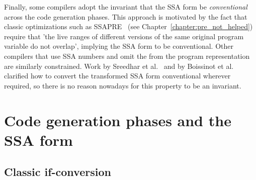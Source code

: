 Finally, some compilers adopt the invariant that the SSA form be
\emph{conventional} across the code generation phases. This approach is
motivated by the fact that classic optimizations such as SSAPRE~\cite{Kennedy:1999:TOPLAS} (see Chapter~\ref{chapter:pre_not_helped}) require that 'the live ranges of different versions
of the same original program variable do not overlap', implying the SSA form to be
conventional. Other compilers that use SSA numbers and omit the \phifuns
from the program representation~\cite{Lapkowski:1996:CASCON} are similarly
constrained. Work by Sreedhar et al.~\cite{Sreedhar:1999:SAS} and by Boissinot
et al.~\cite{boissinot09revisiting} clarified how to convert the transformed SSA
form conventional wherever required, so there is no reason nowadays for this
property to be an invariant.



\section{Code generation phases and the SSA form}
\label{sec:ssa-codegen-suitability}

\begin{comment}

\subsection{Instruction selection}

Instruction selection (Chapter~\ref{chapter:code_selection}). Unlike
classic techniques that match one IR tree or one DAG at a time, using the SSA
form as input extends the scope of pattern matching to more complex IR graphs,
in particular those resulting from control-flow constructs.

\end{comment}

\subsection{Classic if-conversion}


